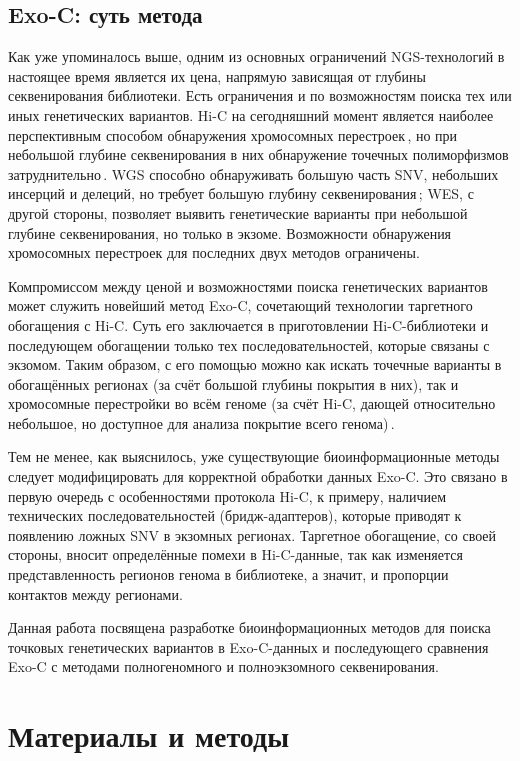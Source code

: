 \documentclass[a4paper,14pt]{extarticle}
\newcommand{\ecitep}[1]{\textenglish{\citep{#1}}}
\begin{document}
\subsection{Exo-C: суть метода}

Как уже упоминалось выше, одним из основных ограничений NGS\hyp{}технологий в настоящее время является их цена, напрямую зависящая от глубины секвенирования библиотеки.
Есть ограничения и по возможностям поиска тех или иных генетических вариантов.
Hi-C на сегодняшний момент является наиболее перспективным способом обнаружения хромосомных перестроек\,\ecitep{Melo_2020}, но при небольшой глубине секвенирования в них обнаружение точечных полиморфизмов затруднительно\,\ecitep{Sims_2014}.
WGS способно обнаруживать большую часть SNV, небольших инсерций и делеций, но требует большую глубину секвенирования\,\ecitep{Sims_2014}; WES, с другой стороны, позволяет выявить генетические варианты при небольшой глубине секвенирования, но только в экзоме.
Возможности обнаружения хромосомных перестроек для последних двух методов ограничены.

Компромиссом между ценой и возможностями поиска генетических вариантов может служить новейший метод Exo-C, сочетающий технологии таргетного обогащения с Hi-C.
Суть его заключается в приготовлении Hi-C\hyp{}библиотеки и последующем обогащении только тех последовательностей, которые связаны с экзомом.
Таким образом, с его помощью можно как искать точечные варианты в обогащённых регионах (за счёт большой глубины покрытия в них), так и хромосомные перестройки во всём геноме (за счёт Hi-C, дающей относительно небольшое, но доступное для анализа покрытие всего генома)\,\ecitep{Mozheiko_2019}.

Тем не менее, как выяснилось, уже существующие биоинформационные методы следует модифицировать для корректной обработки данных Exo-C.
Это связано в первую очередь с особенностями протокола Hi-C, к примеру, наличием технических последовательностей (бридж-адаптеров), которые приводят к появлению ложных SNV в экзомных регионах.
Таргетное обогащение, со своей стороны, вносит определённые помехи в Hi-C-данные, так как изменяется представленность регионов генома в библиотеке, а значит, и пропорции контактов между регионами.

Данная работа посвящена разработке биоинформационных методов для поиска точковых генетических вариантов в Exo-C-данных и последующего сравнения Exo-C с методами полногеномного и полноэкзомного секвенирования.

\section{Материалы и методы}
\end{document}

